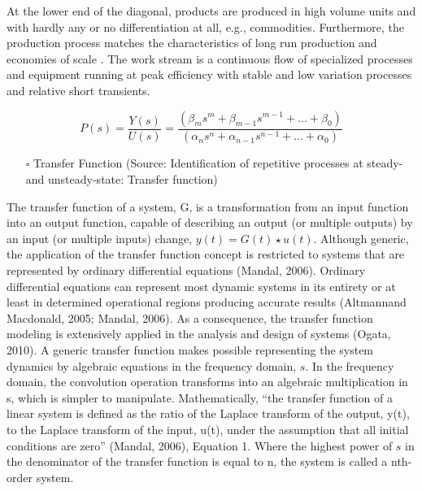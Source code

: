 \documentclass{article}
\begin{document}
\begin{enumerate}
At the lower end of the diagonal, products are produced in high volume units and with hardly any or no differentiation at all, e.g., commodities.
Furthermore, the production process matches the characteristics of long run production \citep[p.154]{Baye2010} and economies of scale \citep[p.185]{Baye2010}.
The work stream is a continuous flow of specialized processes and equipment running at peak efficiency with stable and low variation processes \citep[pp.8-10]{Hopp2001} and relative short transients.


\begin{equation}\label{eq:Productivity_Function}
	P(s) = \frac{Y(s)}{U(s)} =
	\frac{(\beta_m s^m + \beta_{m-1} s^{m-1}+\ldots+\beta_0)}{(\alpha_n s^n + \alpha_{n-1} s^{n-1}+\ldots+\alpha_0)}
\end{equation}


\begin{itemize}
\item[{$\square$}] Transfer Function (Source: Identification of repetitive processes at steady- and unsteady-state: Transfer function)
\end{itemize}

The transfer function of a system, G, is a transformation from an input function into an output function, capable of describing an output (or multiple outputs) by an input (or multiple inputs) change, \(y(t) = G(t) \star u(t)\).
Although generic, the application of the transfer function concept is restricted to systems that are represented by ordinary differential equations (Mandal, 2006).
Ordinary differential equations can represent most dynamic systems in its entirety or at least in determined operational regions producing accurate results (Altmannand Macdonald, 2005; Mandal, 2006).
As a consequence, the transfer function modeling is extensively applied in the analysis and design of systems (Ogata, 2010). A generic transfer function makes possible representing the system dynamics by algebraic equations in the frequency domain, \(s\).
In the frequency domain, the convolution operation transforms into an algebraic multiplication in s, which is simpler to manipulate. Mathematically, “the transfer function of a linear system is defined as the ratio of the Laplace transform of the output, y(t), to the Laplace transform of the input, u(t), under the assumption that all initial conditions are zero” (Mandal, 2006), Equation 1.
Where the highest power of \(s\) in the denominator of the transfer function is equal to n, the system is called a nth-order system.
\end{enumerate}
\end{document}
